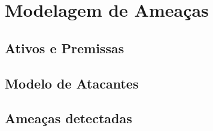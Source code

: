 \chapter{Modelagem de Ameaças} \label{cap:modelagemameacas}

\section{Ativos e Premissas}
\section{Modelo de Atacantes}
\section{Ameaças detectadas}
